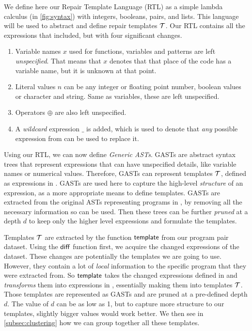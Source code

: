 We define here our Repair Template Language (RTL) as a simple lambda calculus
(\repairLang in \autoref{fig:syntax}) with integers, booleans, pairs, and lists.
This language will be used to abstract and define repair templates $\mathcal{T}$. Our RTL
contains all the expressions that \lang included, but with four significant
changes.

\begin{enumerate}
    \item Variable names $x$ used for functions, variables and patterns are left
    \emph{unspecified}. That means that $x$ denotes that that place of the code
    has a variable name, but it is unknown at that point.
    \item Literal values $n$ can be any integer or floating point number,
    boolean values or character and string. Same as variables, these are left
    unspecified.
    \item Operators $\oplus$ are also left unspecified.
    \item A \emph{wildcard} expression $\_$ is added, which is used to denote
    that \emph{any} possible expression from \repairLang can be used to replace
    it.
\end{enumerate}



Using our RTL, we can now define \emph{Generic ASTs}. GASTs are abstract syntax
trees that represent expressions that can have unspecified details, like
variable names or numerical values. Therefore, GASTs can represent templates
$\mathcal{T}$, defined as expressions in \repairLang. GASTs are used here to capture the
high-level \emph{structure} of an expression, as a more appropriate means to
define templates. GASTs are extracted from the original ASTs representing
programs in \lang, by removing all the necessary information so \repairLang can
be used. Then these trees can be further \emph{pruned} at a depth $d$ to keep
only the higher level expressions and formulate the templates.


Templates $\mathcal{T}$ are extracted by the function $\mathsf{template}$ from our program
pair dataset. Using the $\mathsf{diff}$ function first, we acquire the changed
expressions of the dataset. These changes are potentially the templates we are
going to use. However, they contain a lot of \emph{local} information to the
specific program that they were extracted from. So $\mathsf{template}$ takes the
changed expressions defined in \lang and \emph{transforms} them into expressions
in \repairLang, essentially making them into templates $\mathcal{T}$. Those templates are
represented as GASTs and are pruned at a pre-defined depth $d$. The value of $d$
can be as low as 1, but to capture more structure to our templates, slightly
bigger values would work better. We then see in \autoref{subsec:clustering} how
we can group together all these templates.

